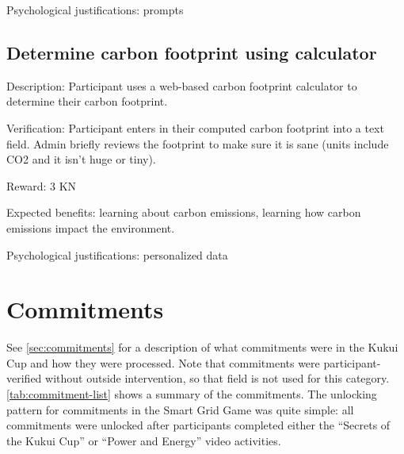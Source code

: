 Psychological justifications: prompts

\subsection{Determine carbon footprint using calculator}

Description: Participant uses a web-based carbon footprint calculator to determine their carbon footprint.

Verification: Participant enters in their computed carbon footprint into a text field. Admin briefly reviews the footprint to make sure it is sane (units include CO2 and it isn't huge or tiny).

Reward: 3 KN

Expected benefits: learning about carbon emissions, learning how carbon emissions impact the environment.

Psychological justifications: personalized data


\section{Commitments}

See \autoref{sec:commitments} for a description of what commitments were in the Kukui Cup and how they were processed. Note that commitments were participant-verified without outside intervention, so that field is not used for this category. \autoref{tab:commitment-list} shows a summary of the commitments. The unlocking pattern for commitments in the Smart Grid Game was quite simple: all commitments were unlocked after participants completed either the ``Secrets of the Kukui Cup'' or ``Power and Energy'' video activities.

